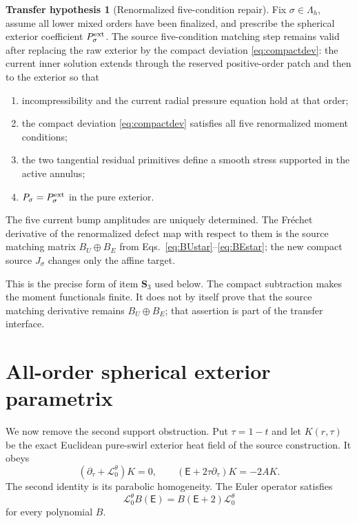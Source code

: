 \documentclass[aps,prd,reprint,superscriptaddress,nofootinbib,floatfix]{revtex4-2}
\theoremstyle{definition}
\newtheorem{hypothesis}[theorem]{Transfer hypothesis}
\theoremstyle{remark}
\newcommand{\cL}{\mathcal{L}}
\newcommand{\Lam}{\Lambda_h}
\newcommand{\Eul}{\mathsf E}
\begin{document}
\begin{hypothesis}[Renormalized five-condition repair]\label{hyp:fiverepair}
	Fix \(\sigma\in\Lam\), assume all lower mixed orders have been finalized, and prescribe the spherical exterior coefficient \(P_\sigma^{\rm ext}\).  The source five-condition matching step remains valid after replacing the raw exterior by the compact deviation \eqref{eq:compactdev}: the current inner solution extends through the reserved positive-order patch and then to the exterior so that
	\begin{enumerate}[label=(\roman*),leftmargin=*]
		\item incompressibility and the current radial pressure equation hold at that order;
		\item the compact deviation \eqref{eq:compactdev} satisfies all five renormalized moment conditions;
		\item the two tangential residual primitives define a smooth stress supported in the active annulus;
		\item \(P_\sigma=P_\sigma^{\rm ext}\) in the pure exterior.
	\end{enumerate}
	The five current bump amplitudes are uniquely determined.  The Fr\'echet derivative of the renormalized defect map with respect to them is the source matching matrix \(B_U\oplus B_E\) from Eqs.~\eqref{eq:BUstar}--\eqref{eq:BEstar}; the new compact source \(J_\sigma\) changes only the affine target.
\end{hypothesis}

This is the precise form of item \(\mathbf S_3\) used below.  The compact subtraction makes the moment functionals finite.  It does not by itself prove that the source matching derivative remains \(B_U\oplus B_E\); that assertion is part of the transfer interface.



\section{All-order spherical exterior parametrix}\label{sec:exterior}

We now remove the second support obstruction. Put $\tau=1-t$ and let $K(r,\tau)$ be the exact Euclidean pure-swirl exterior heat field of the source construction. It obeys
\begin{equation}
	(\partial_\tau+\cL_0^\theta)K=0,
	\qquad (\Eul+2\tau\partial_\tau)K=-2A K.
	\label{eq:Kidentities}
\end{equation}
The second identity is its parabolic homogeneity. The Euler operator satisfies
\begin{equation}
	\cL_0^\theta B(\Eul)=B(\Eul+2)\cL_0^\theta
	\label{eq:commute}
\end{equation}
for every polynomial $B$.
\end{document}

